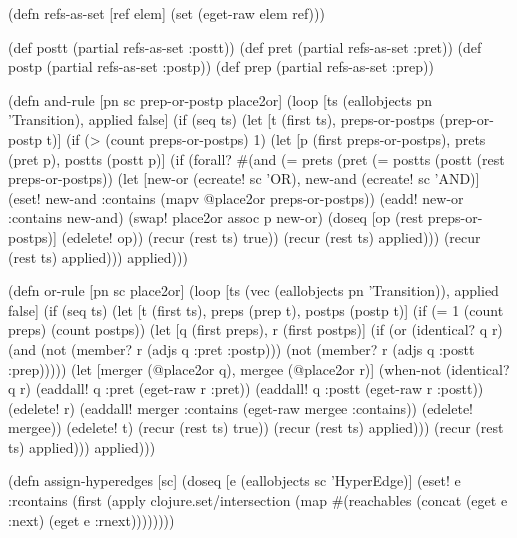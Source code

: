 \documentclass[submission]{eptcs}
\begin{document}
\begin{clojurecode}
(defn refs-as-set [ref elem]
  (set (eget-raw elem ref)))

(def postt (partial refs-as-set :postt))
(def pret  (partial refs-as-set :pret))
(def postp (partial refs-as-set :postp))
(def prep  (partial refs-as-set :prep))

(defn and-rule [pn sc prep-or-postp place2or]
  (loop [ts (eallobjects pn 'Transition), applied false]
    (if (seq ts)
      (let [t (first ts), preps-or-postps (prep-or-postp t)]
        (if (> (count preps-or-postps) 1)
          (let [p (first preps-or-postps), prets (pret p), postts (postt p)]
            (if (forall? #(and (= prets  (pret %
                               (= postts (postt %
                         (rest preps-or-postps))
              (let [new-or  (ecreate! sc 'OR), new-and (ecreate! sc 'AND)]
                (eset! new-and :contains (mapv @place2or preps-or-postps))
                (eadd! new-or  :contains new-and)
                (swap! place2or assoc p new-or)
                (doseq [op (rest preps-or-postps)]
                  (edelete! op))
                (recur (rest ts) true))
              (recur (rest ts) applied)))
          (recur (rest ts) applied)))
      applied)))

(defn or-rule [pn sc place2or]
  (loop [ts (vec (eallobjects pn 'Transition)), applied false]
    (if (seq ts)
      (let [t (first ts), preps (prep t), postps (postp t)]
        (if (= 1 (count preps) (count postps))
          (let [q (first preps), r (first postps)]
            (if (or (identical? q r)
                    (and (not (member? r (adjs q :pret :postp)))
                         (not (member? r (adjs q :postt :prep)))))
              (let [merger (@place2or q), mergee (@place2or r)]
                (when-not (identical? q r)
                  (eaddall! q :pret  (eget-raw r :pret))
                  (eaddall! q :postt (eget-raw r :postt))
                  (edelete! r)
                  (eaddall! merger :contains (eget-raw mergee :contains))
                  (edelete! mergee))
                (edelete! t)
                (recur (rest ts) true))
              (recur (rest ts) applied)))
          (recur (rest ts) applied)))
      applied)))

(defn assign-hyperedges [sc]
  (doseq [e (eallobjects sc 'HyperEdge)]
    (eset! e :rcontains
           (first (apply clojure.set/intersection
                         (map #(reachables %
                              (concat (eget e :next) (eget e :rnext))))))))


\end{clojurecode}
\end{document}
